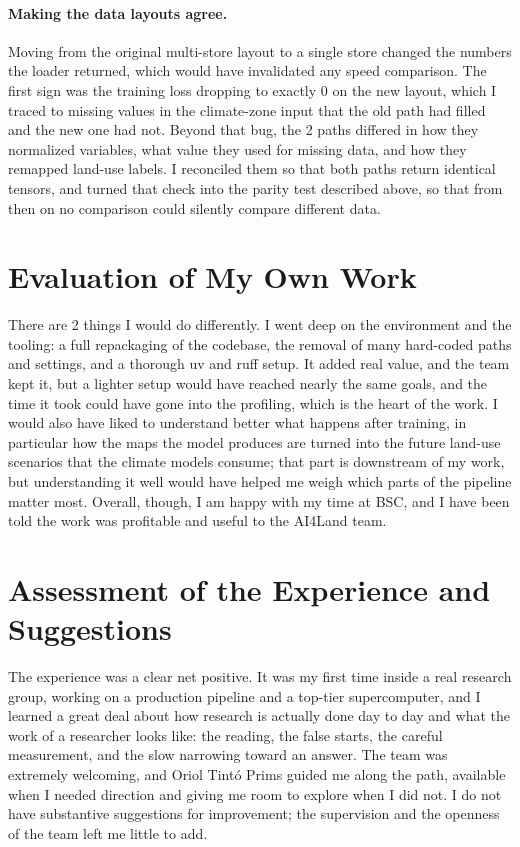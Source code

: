\documentclass[12pt,a4paper]{article}
\begin{document}
\paragraph{Making the data layouts agree.} Moving from the original multi-store layout to a single
store changed the numbers the loader returned, which would have invalidated any speed comparison. The
first sign was the training loss dropping to exactly 0 on the new layout, which I traced to missing
values in the climate-zone input that the old path had filled and the new one had not. Beyond that
bug, the 2 paths differed in how they normalized variables, what value they used for missing data,
and how they remapped land-use labels. I reconciled them so that both paths return identical tensors,
and turned that check into the parity test described above, so that from then on no comparison could
silently compare different data.

\section{Evaluation of My Own Work}

There are 2 things I would do differently. I went deep on the environment and the tooling: a full
repackaging of the codebase, the removal of many hard-coded paths and settings, and a thorough uv and
ruff setup. It added real value, and the team kept it, but a lighter setup would have reached nearly
the same goals, and the time it took could have gone into the profiling, which is the heart of the
work. I would also have liked to understand better what happens after training, in particular how the
maps the model produces are turned into the future land-use scenarios that the climate models consume;
that part is downstream of my work, but understanding it well would have helped me weigh which parts of
the pipeline matter most. Overall, though, I am happy with my time at BSC, and I have been told the
work was profitable and useful to the AI4Land team.

\section{Assessment of the Experience and Suggestions}

The experience was a clear net positive. It was my first time inside a real research group, working
on a production pipeline and a top-tier supercomputer, and I learned a great deal about how research
is actually done day to day and what the work of a researcher looks like: the reading, the false
starts, the careful measurement, and the slow narrowing toward an answer. The team was extremely
welcoming, and Oriol Tint\'o Prims guided me along the path, available when I needed direction and
giving me room to explore when I did not. I do not have substantive suggestions for improvement; the
supervision and the openness of the team left me little to add.
\end{document}
